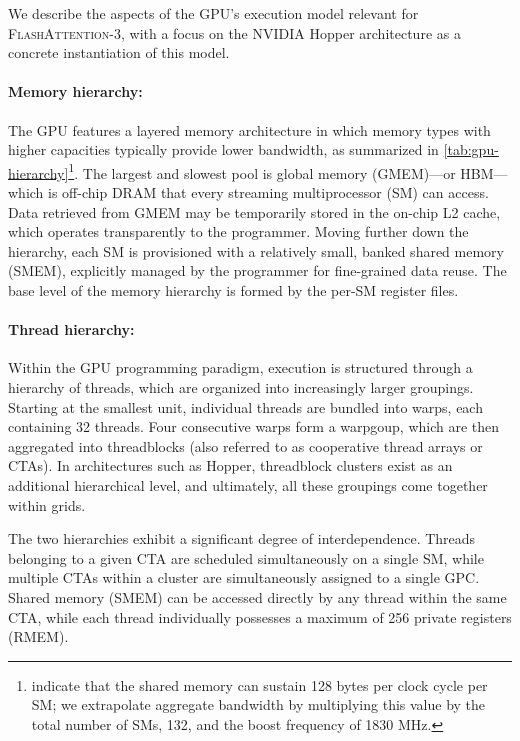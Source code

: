 We describe the aspects of the GPU's execution model relevant for \textsc{FlashAttention-3}, with a focus on the NVIDIA Hopper architecture as a concrete instantiation of this model.

\paragraph{Memory hierarchy:} The GPU features a layered memory architecture in which memory types with higher capacities typically provide lower bandwidth, as summarized in \cref{tab:gpu-hierarchy}\footnote{\citet{luo2024benchmarking} indicate that the shared memory can sustain 128 bytes per clock cycle per SM; we extrapolate aggregate bandwidth by multiplying this value by the total number of SMs, 132, and the boost frequency of 1830 MHz.}. The largest and slowest pool is global memory (GMEM)—or HBM—which is off-chip DRAM that every streaming multiprocessor (SM) can access. Data retrieved from GMEM may be temporarily stored in the on-chip L2 cache, which operates transparently to the programmer. Moving further down the hierarchy, each SM is provisioned with a relatively small, banked shared memory (SMEM), explicitly managed by the programmer for fine-grained data reuse. The base level of the memory hierarchy is formed by the per-SM register files.

\paragraph{Thread hierarchy:} Within the GPU programming paradigm, execution is structured through a hierarchy of threads, which are organized into increasingly larger groupings. Starting at the smallest unit, individual threads are bundled into warps, each containing 32 threads. Four consecutive warps form a warpgoup, which are then aggregated into threadblocks (also referred to as cooperative thread arrays or CTAs). In architectures such as Hopper, threadblock clusters exist as an additional hierarchical level, and ultimately, all these groupings come together within grids.

The two hierarchies exhibit a significant degree of interdependence. Threads belonging to a given CTA are scheduled simultaneously on a single SM, while multiple CTAs within a cluster are simultaneously assigned to a single GPC. Shared memory (SMEM) can be accessed directly by any thread within the same CTA, while each thread individually possesses a maximum of 256 private registers (RMEM).

